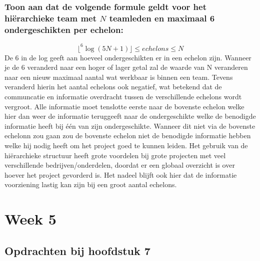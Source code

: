 \documentclass[a4paper,titlepage]{artikel1}
\begin{document}
   \subsubsection[Opdracht 4]{Toon aan dat de volgende formule geldt voor het hi\"{e}rarchieke team met $N$ teamleden en maximaal 6 ondergeschikten per echelon:}
   \begin{displaymath}
     \lfloor^6\log{(5N+1)}\rfloor\leq echelons\leq N
   \end{displaymath}
   De $6$ in de log geeft aan hoeveel ondergeschikten er in een echelon zijn. Wanneer je de $6$ veranderd naar een hoger of lager getal zal de waarde van N veranderen naar een nieuw maximaal aantal wat werkbaar is binnen een team. Tevens veranderd hierin het aantal echelons ook negatief, wat betekend dat de communcatie en informatie overdracht tussen de verschillende echelons wordt vergroot. Alle informatie moet tenslotte eerste naar de bovenste echelon welke hier dan weer de informatie teruggeeft naar de ondergeschikte welke de benodigde informatie heeft bij \'{e}\'{e}n van zijn ondergeschikte. Wanneer dit niet via de bovenste echelonn zou gaan zou de bovenste echelon niet de benodigde informatie hebben welke hij nodig heeft om het project goed te kunnen leiden. Het gebruik van de hi\"{e}rarchieke structuur heeft grote voordelen bij grote projecten met veel verschillende bedrijven/onderdelen, doordat er een globaal overzicht is over hoever het project gevorderd is. Het nadeel blijft ook hier dat de informatie voorziening lastig kan zijn bij een groot aantal echelons.
   \section{Week 5}
   \subsection{Opdrachten bij hoofdstuk 7}
\end{document}
